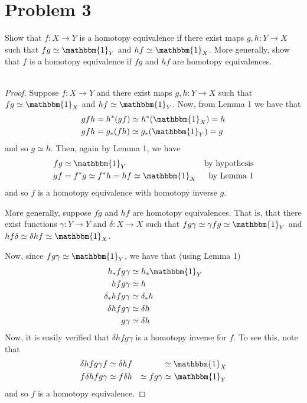 \documentclass[fontsize=11pt]{scrartcl} %
\numberwithin{equation}{section} %
\numberwithin{figure}{section} %
\numberwithin{table}{section} %
\begin{document}
\section*{Problem 3} %
Show that $f:X\to Y$ is a homotopy equivalence if there exist maps $g,h:Y\to X$
such that $fg\simeq\mathbbm{1}_Y$ and $hf\simeq\mathbbm{1}_X$. More generally, show that
$f$ is a homotopy equivalence if $fg$ and $hf$ are homotopy equivalences.
\\
\\
\begin{proof}
    Suppose $f:X\to Y$ and there exist maps $g,h:Y\to X$ such that
    $fg\simeq\mathbbm{1}_X$ and $hf\simeq\mathbbm{1}_Y$.
    Now, from Lemma 1 we have that
    \[
        \begin{aligned}
            gfh &= h^*(gf) \simeq h^*(\mathbbm{1}_X) = h\\
            gfh &= g_*(fh) \simeq g_*(\mathbbm{1}_Y) = g
        \end{aligned}
    \]
    and so $g\simeq h$. Then, again by Lemma 1, we have
    \[
        \begin{aligned}
            fg &\simeq\mathbbm{1}_Y &\text{by hypothesis}\\
            gf &=f^*g \simeq f^*h = hf\simeq \mathbbm{1}_X &\text{by Lemma 1}
        \end{aligned}
    \]
    and so $f$ is a homotopy equivalence with homotopy inverse $g$.

    More generally, suppose $fg$ and $hf$ are homotopy equivalences. That is,
    that there exist functions $\gamma:Y\to Y$ and $\delta:X\to X$ such that
    $fg\gamma\simeq \gamma fg\simeq \mathbbm{1}_Y$ and $hf\delta\simeq \delta hf\simeq
    \mathbbm{1}_X$.

    Now, since $fg\gamma \simeq \mathbbm{1}_Y$, we have that (using Lemma 1)
    \[
        \begin{aligned}
            h_*fg\gamma &\simeq h_*\mathbbm{1}_Y\\
            hfg\gamma &\simeq h\\
            \delta_*hfg\gamma &\simeq \delta_*h\\
            \delta hfg\gamma &\simeq \delta h\\
            g\gamma &\simeq \delta h
        \end{aligned}
    \]
    Now, it is easily verified that $\delta hfg\gamma$ is a homotopy inverse for
    $f$. To see this, note that
    \[
        \begin{aligned}
            \delta hfg\gamma f &\simeq \delta hf &\simeq \mathbbm{1}_X\\
            f\delta hfg\gamma &\simeq f\delta h &\simeq fg\gamma\simeq
            \mathbbm{1}_Y
        \end{aligned}
    \]
    and so $f$ is a homotopy equivalence.
\end{proof}
\end{document}
